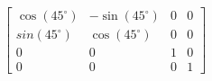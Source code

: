 \documentclass[preview]{standalone}
\begin{document}
\begin{align*}
\begin{bmatrix} \cos(45^{\circ}) & -\sin(45^{\circ}) & 0 & 0\\sin(45^{\circ}) & \cos(45^{\circ}) & 0 & 0\\ 0 & 0 & 1 & 0\\ 0 & 0 & 0 & 1\end{bmatrix}
\end{align*}
\end{document}
